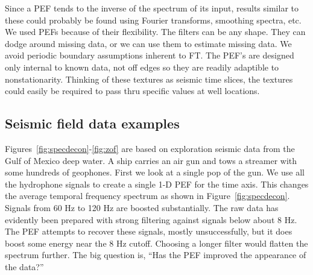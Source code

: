 



\par
Since a PEF tends to the inverse of the spectrum of its input,
results similar to these could probably be found
using Fourier transforms, smoothing spectra, etc.
We used PEFs because of their flexibility.
The filters can be any shape.
They can dodge around missing data, or we can use them
to estimate missing data.
We avoid periodic boundary assumptions inherent to FT.
The PEF's are designed only internal to known data, not off edges
so they are readily adaptible to nonstationarity.
Thinking of these textures as seismic time slices,
the textures could easily be required to pass thru specific
values at well locations.  



\subsection{Seismic field data examples}
\par
Figures~\ref{fig:specdecon}-\ref{fig:zof}
are based on exploration seismic data from the Gulf of Mexico deep water.
A ship carries an air gun and tows a streamer with some hundreds of geophones.
First we look at a single pop of the gun.
We use all the hydrophone signals to create a single 1-D PEF for the time axis.
This changes the average temporal frequency spectrum
as shown in Figure~\ref{fig:specdecon}.
Signals from 60 Hz to 120 Hz are boosted substantially.
The raw data has evidently been prepared
with strong filtering against signals below about 8 Hz.
The PEF attempts to recover these signals, mostly unsuccessfully,
but it does boost some energy near the 8 Hz cutoff.
Choosing a longer filter would flatten the spectrum further.
The big question is, ``Has the PEF improved the appearance of the data?''

